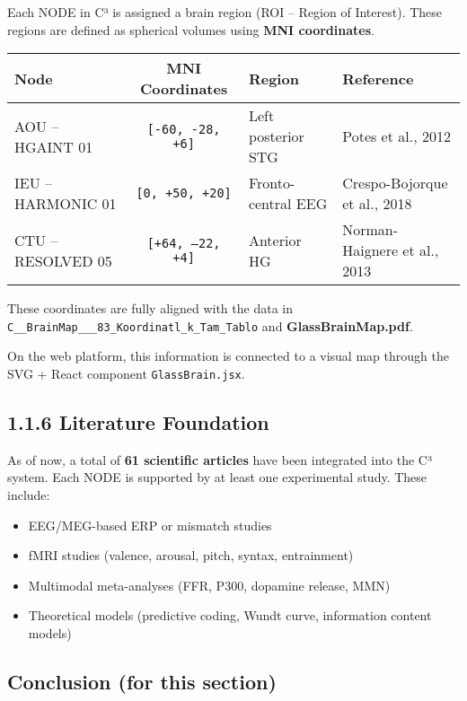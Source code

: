 \documentclass[10pt]{article}
\begin{document}
Each NODE in C³ is assigned a brain region (ROI – Region of Interest). These regions are defined as spherical volumes using \textbf{MNI coordinates}.

\begin{center}
\begin{tabular}{|l|c|l|l|}
\hline
\textbf{Node} & \textbf{MNI Coordinates} & \textbf{Region} & \textbf{Reference} \\
\hline
AOU – HGAINT 01 & \texttt{[-60, -28, +6]} & Left posterior STG & Potes et al., 2012 \\
IEU – HARMONIC 01 & \texttt{[0, +50, +20]} & Fronto-central EEG & Crespo-Bojorque et al., 2018 \\
CTU – RESOLVED 05 & \texttt{[+64, –22, +4]} & Anterior HG & Norman-Haignere et al., 2013 \\
\hline
\end{tabular}
\end{center}

These coordinates are fully aligned with the data in \texttt{C\_\_BrainMap\_\_\_83\_Koordinatl\_k\_Tam\_Tablo} and \textbf{GlassBrainMap.pdf}.

On the web platform, this information is connected to a visual map through the SVG + React component \texttt{GlassBrain.jsx}.

\subsection*{1.1.6 Literature Foundation}

As of now, a total of \textbf{61 scientific articles} have been integrated into the C³ system. Each NODE is supported by at least one experimental study. These include:

\begin{itemize}
    \item EEG/MEG-based ERP or mismatch studies
    \item fMRI studies (valence, arousal, pitch, syntax, entrainment)
    \item Multimodal meta-analyses (FFR, P300, dopamine release, MMN)
    \item Theoretical models (predictive coding, Wundt curve, information content models)
\end{itemize}

\subsection*{Conclusion (for this section)}
\end{document}
